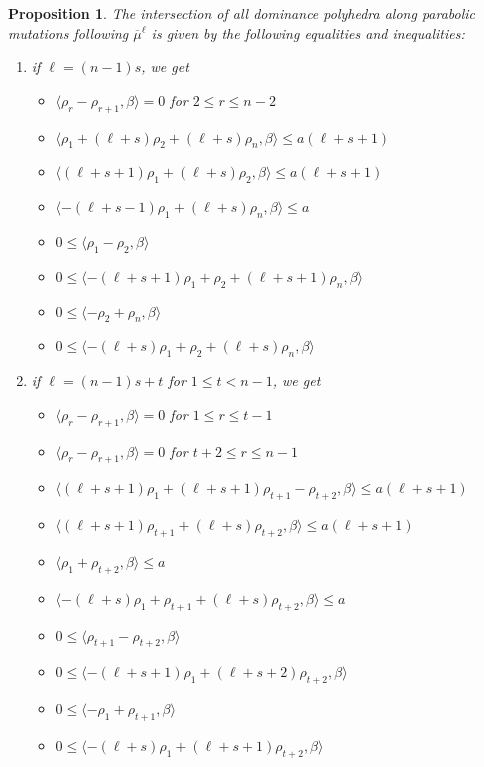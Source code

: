 \documentclass{amsart}
\newtheorem{proposition}[theorem]{Proposition}
\numberwithin{theorem}{section}
\begin{document}
  \begin{proposition}
    The intersection of all dominance polyhedra along parabolic mutations following $\overline{\mu}^\ell$ is given by the following equalities and inequalities:
    \begin{enumerate}
      \item if $\ell=(n-1)s$, we get 
        \begin{itemize}
          \item $\langle \rho_r-\rho_{r+1}, \beta\rangle = 0$ for $2\le r\le n-2$
          \item $\langle \rho_1+(\ell+s)\rho_2+(\ell+s)\rho_n, \beta\rangle \le a(\ell+s+1)$
          \item $\langle (\ell+s+1)\rho_1+(\ell+s)\rho_2, \beta\rangle \le a(\ell+s+1)$
          \item $\langle -(\ell+s-1)\rho_1+(\ell+s)\rho_n, \beta\rangle \le a$
          \item $0 \le \langle \rho_1-\rho_2, \beta\rangle$
          \item $0 \le \langle -(\ell+s+1)\rho_1+\rho_2+(\ell+s+1)\rho_n, \beta\rangle$
          \item $0 \le \langle -\rho_2+\rho_n, \beta\rangle$
          \item $0 \le \langle -(\ell+s)\rho_1+\rho_2+(\ell+s)\rho_n, \beta\rangle$
        \end{itemize}
      \item if $\ell=(n-1)s+t$ for $1\le t < n-1$, we get 
        \begin{itemize}
          \item $\langle \rho_r-\rho_{r+1}, \beta\rangle = 0$ for $1\le r\le t-1$
          \item $\langle \rho_r-\rho_{r+1}, \beta\rangle = 0$ for $t+2\le r\le n-1$
          \item $\langle (\ell+s+1)\rho_1+(\ell+s+1)\rho_{t+1}-\rho_{t+2}, \beta\rangle \le a(\ell+s+1)$
          \item $\langle (\ell+s+1)\rho_{t+1}+(\ell+s)\rho_{t+2}, \beta\rangle \le a(\ell+s+1)$
          \item $\langle \rho_1+\rho_{t+2}, \beta\rangle \le a$
          \item $\langle -(\ell+s)\rho_1+\rho_{t+1}+(\ell+s)\rho_{t+2}, \beta\rangle \le a$
          \item $0 \le \langle \rho_{t+1}-\rho_{t+2}, \beta\rangle$
          \item $0 \le \langle -(\ell+s+1)\rho_1+(\ell+s+2)\rho_{t+2}, \beta\rangle$
          \item $0 \le \langle -\rho_1+\rho_{t+1}, \beta\rangle$
          \item $0 \le \langle -(\ell+s)\rho_1+(\ell+s+1)\rho_{t+2}, \beta\rangle$
        \end{itemize}
    \end{enumerate}
  \end{proposition}


  
\end{document}
